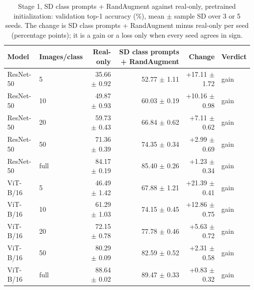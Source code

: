 \begin{table}[H]
\centering
\caption{Stage 1, SD class prompts + RandAugment against real-only, pretrained initialization: validation top-1 accuracy (\%), mean $\pm$ sample SD over 3 or 5 seeds. The change is SD class prompts + RandAugment minus real-only per seed (percentage points); it is a gain or a loss only when every seed agrees in sign.}
\label{tab:stage1-pretrained-accuracy-sd_prompt_randaugment}
\begin{tabular}{llrrrl}
\toprule
Model & Images/class & Real-only & SD class prompts + RandAugment & Change & Verdict \\
\midrule
ResNet-50 & 5 & 35.66 $\pm$ 0.92 & 52.77 $\pm$ 1.11 & +17.11 $\pm$ 1.72 & gain \\
ResNet-50 & 10 & 49.87 $\pm$ 0.93 & 60.03 $\pm$ 0.19 & +10.16 $\pm$ 0.98 & gain \\
ResNet-50 & 20 & 59.73 $\pm$ 0.43 & 66.84 $\pm$ 0.62 & +7.11 $\pm$ 0.62 & gain \\
ResNet-50 & 50 & 71.36 $\pm$ 0.39 & 74.35 $\pm$ 0.34 & +2.99 $\pm$ 0.69 & gain \\
ResNet-50 & full & 84.17 $\pm$ 0.19 & 85.40 $\pm$ 0.26 & +1.23 $\pm$ 0.34 & gain \\
\midrule
ViT-B/16 & 5 & 46.49 $\pm$ 1.42 & 67.88 $\pm$ 1.21 & +21.39 $\pm$ 0.41 & gain \\
ViT-B/16 & 10 & 61.29 $\pm$ 1.03 & 74.15 $\pm$ 0.45 & +12.86 $\pm$ 0.75 & gain \\
ViT-B/16 & 20 & 72.15 $\pm$ 0.78 & 77.78 $\pm$ 0.46 & +5.63 $\pm$ 0.72 & gain \\
ViT-B/16 & 50 & 80.29 $\pm$ 0.09 & 82.59 $\pm$ 0.52 & +2.31 $\pm$ 0.58 & gain \\
ViT-B/16 & full & 88.64 $\pm$ 0.02 & 89.47 $\pm$ 0.33 & +0.83 $\pm$ 0.32 & gain \\
\bottomrule
\end{tabular}
\end{table}

